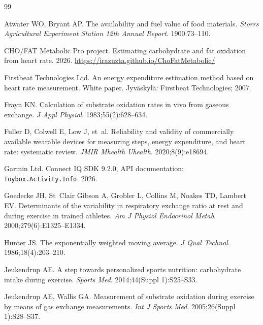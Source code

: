 \documentclass[10pt,a4paper]{article}
\newcommand{\webprojecte}{\url{https://irazuzta.github.io/ChoFatMetabolic/}}
\begin{document}
\begin{thebibliography}{99}
\small

Atwater WO, Bryant AP.
\newblock The availability and fuel value of food materials.
\newblock \emph{Storrs Agricultural Experiment Station 12th Annual Report}. 1900:73--110.

CHO/FAT Metabolic Pro project.
\newblock Estimating carbohydrate and fat oxidation from heart rate. 2026.
\newblock \webprojecte

Firstbeat Technologies Ltd.
\newblock An energy expenditure estimation method based on heart rate measurement.
\newblock White paper. Jyväskylä: Firstbeat Technologies; 2007.

Frayn KN.
\newblock Calculation of substrate oxidation rates in vivo from gaseous exchange.
\newblock \emph{J Appl Physiol}. 1983;55(2):628--634.

Fuller D, Colwell E, Low J, et~al.
\newblock Reliability and validity of commercially available wearable devices for
  measuring steps, energy expenditure, and heart rate: systematic review.
\newblock \emph{JMIR Mhealth Uhealth}. 2020;8(9):e18694.

Garmin Ltd.
\newblock Connect IQ SDK 9.2.0, API documentation: \texttt{Toybox.Activity.Info}.
  2026.

Goedecke JH, St~Clair Gibson A, Grobler L, Collins M, Noakes TD, Lambert EV.
\newblock Determinants of the variability in respiratory exchange ratio at rest and during
  exercise in trained athletes.
\newblock \emph{Am J Physiol Endocrinol Metab}. 2000;279(6):E1325--E1334.

Hunter JS.
\newblock The exponentially weighted moving average.
\newblock \emph{J Qual Technol}. 1986;18(4):203--210.

Jeukendrup AE.
\newblock A step towards personalized sports nutrition: carbohydrate intake during
  exercise.
\newblock \emph{Sports Med}. 2014;44(Suppl 1):S25--S33.

Jeukendrup AE, Wallis GA.
\newblock Measurement of substrate oxidation during exercise by means of gas
  exchange measurements.
\newblock \emph{Int J Sports Med}. 2005;26(Suppl 1):S28--S37.


\end{thebibliography}
\end{document}
